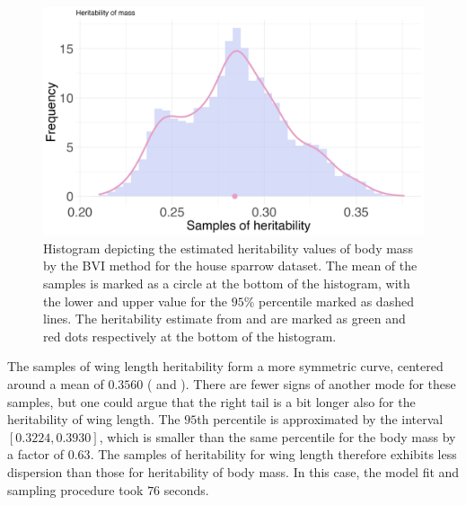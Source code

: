 \begin{figure}[H]
  \centering
    \includegraphics[width=1\linewidth]{Figures/House sparrow study/Heritability_mass.png}
    \caption{Histogram depicting the estimated heritability values of body mass by the BVI method for the house sparrow dataset. The mean of the samples is marked as a circle at the bottom of the histogram, with the lower and upper value for the $95\%$ percentile marked as dashed lines. The heritability estimate from \citet{Silva2017} and \citet{Muff2019Genetic} are marked as green and red dots respectively at the bottom of the histogram.}
    \label{fig:heritability_mass}
\end{figure}
\noindent The samples of wing length heritability form a more symmetric curve, centered around a mean of $0.3560$ ( and ). There are fewer signs of another mode for these samples, but one could argue that the right tail is a bit longer also for the heritability of wing length. The $95$th percentile is approximated by the interval $[0.3224, 0.3930]$, which is smaller than the same percentile for the body mass by a factor of $0.63$. The samples of heritability for wing length therefore exhibits less dispersion than those for heritability of body mass. In this case, the model fit and sampling procedure took $76$ seconds.
